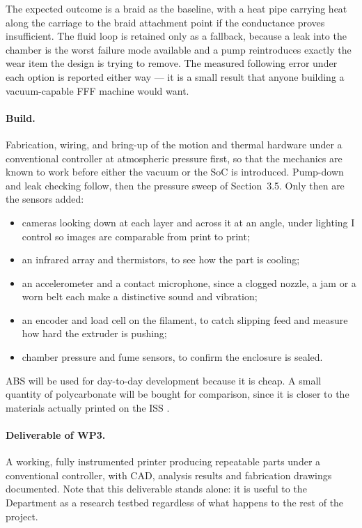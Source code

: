 \documentclass[11pt,a4paper]{article}
\begin{document}
\medskip\noindent
The expected outcome is a braid as the baseline, with a heat pipe carrying heat
along the carriage to the braid attachment point if the conductance proves
insufficient. The fluid loop is retained only as a fallback, because a leak into
the chamber is the worst failure mode available and a pump reintroduces exactly
the wear item the design is trying to remove. The measured following error under
each option is reported either way --- it is a small result that anyone building
a vacuum-capable FFF machine would want.

\paragraph{Build.} Fabrication, wiring, and bring-up of the motion and thermal
hardware under a conventional controller at atmospheric pressure first, so that
the mechanics are known to work before either the vacuum or the SoC is
introduced. Pump-down and leak checking follow, then the pressure sweep of
Section~3.5. Only then are the sensors added:

\begin{itemize}
  \item cameras looking down at each layer and across it at an angle, under
        lighting I control so images are comparable from print to print;
  \item an infrared array and thermistors, to see how the part is cooling;
  \item an accelerometer and a contact microphone, since a clogged nozzle, a jam
        or a worn belt each make a distinctive sound and vibration;
  \item an encoder and load cell on the filament, to catch slipping feed and
        measure how hard the extruder is pushing;
  \item chamber pressure and fume sensors, to confirm the enclosure is sealed.
\end{itemize}

ABS will be used for day-to-day development because it is cheap. A small quantity
of polycarbonate will be bought for comparison, since it is closer to the
materials actually printed on the ISS \cite{issnl_amf}.

\paragraph{Deliverable of WP3.} A working, fully instrumented printer producing
repeatable parts under a conventional controller, with CAD, analysis results and
fabrication drawings documented. Note that this deliverable stands alone: it is
useful to the Department as a research testbed regardless of what happens to the
rest of the project.
\end{document}
